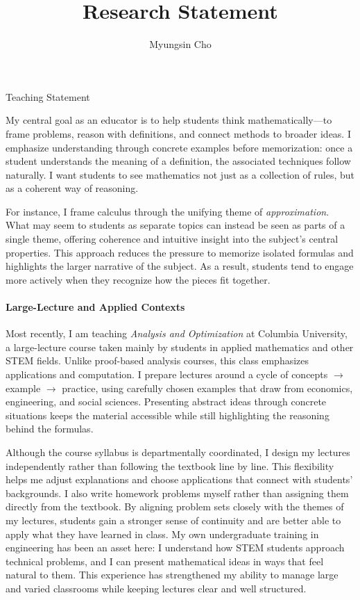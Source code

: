 \documentclass[11pt]{article}
\title{Research Statement}
\author{Myungsin Cho}
\date{}
\begin{document}
\begin{center}\LARGE{Teaching Statement}\end{center}

My central goal as an educator is to help students think mathematically—to frame problems, reason with definitions, and connect methods to broader ideas.
I emphasize understanding through concrete examples before memorization: once a student understands the meaning of a definition, the associated techniques follow naturally.
I want students to see mathematics not just as a collection of rules, but as a coherent way of reasoning.

For instance, I frame calculus through the unifying theme of \emph{approximation}. 
What may seem to students as separate topics can instead be seen as parts of a single theme, offering coherence and intuitive insight into the subject’s central properties. 
This approach reduces the pressure to memorize isolated formulas and highlights the larger narrative of the subject. 
As a result, students tend to engage more actively when they recognize how the pieces fit together.

\paragraph{Large-Lecture and Applied Contexts}\quad 

Most recently, I am teaching {\it Analysis and Optimization} at Columbia University, a large-lecture course taken mainly by students in applied mathematics and other STEM fields. 
Unlike proof-based analysis courses, this class emphasizes applications and computation. 
I prepare lectures around a cycle of concepts $\to$ example $\to$ practice, using carefully chosen examples that draw from economics, engineering, and social sciences.
Presenting abstract ideas through concrete situations keeps the material accessible while still highlighting the reasoning behind the formulas.

Although the course syllabus is departmentally coordinated, I design my lectures independently rather than following the textbook line by line.
This flexibility helps me adjust explanations and choose applications that connect with students’ backgrounds.
I also write homework problems myself rather than assigning them directly from the textbook. 
By aligning problem sets closely with the themes of my lectures, students gain a stronger sense of continuity and are better able to apply what they have learned in class.
My own undergraduate training in engineering has been an asset here: I understand how STEM students approach technical problems, and I can present mathematical ideas in ways that feel natural to them. 
This experience has strengthened my ability to manage large and varied classrooms while keeping lectures clear and well structured.
\end{document}
